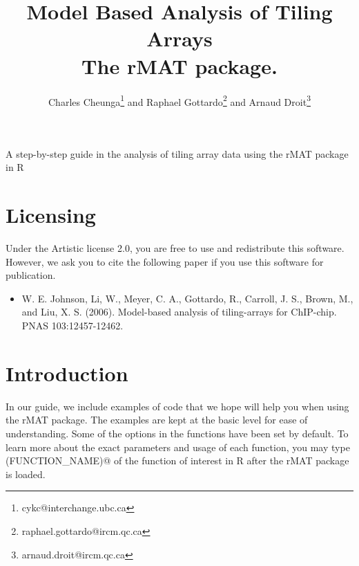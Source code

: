 \documentclass[11pt]{article}
\author{Charles Cheunga\footnote{cykc@interchange.ubc.ca} and Raphael
  Gottardo\footnote{raphael.gottardo@ircm.qc.ca} and Arnaud Droit\footnote{arnaud.droit@ircm.qc.ca}}
\begin{document}
\title{Model Based Analysis of Tiling Arrays\\ The rMAT package.}
\maketitle



\textnormal {\normalfont}
A step-by-step guide in the analysis of tiling array data using the rMAT package in R

\tableofcontents
\newpage


\part{Licensing}

Under the Artistic license 2.0, you are free to use and redistribute this software. However, we ask you to cite the following paper if you use this software for publication. 

\begin{itemize}
\item[]W. E. Johnson, Li, W., Meyer, C. A., Gottardo, R., Carroll, J. S., Brown, M., and Liu, X. S. (2006). Model-based analysis of tiling-arrays for ChIP-chip. PNAS 103:12457-12462.
\end{itemize}

\part{Introduction}
	In our guide, we include examples of code that we hope will help you when using the rMAT package. The examples are kept at the basic level for ease of understanding. Some of the options in the functions have been set by default. To learn more about the exact parameters and usage of each function, you may type \verb@help(FUNCTION_NAME)@ of the function of interest in R after the rMAT package is loaded.
\newline
\end{document}
